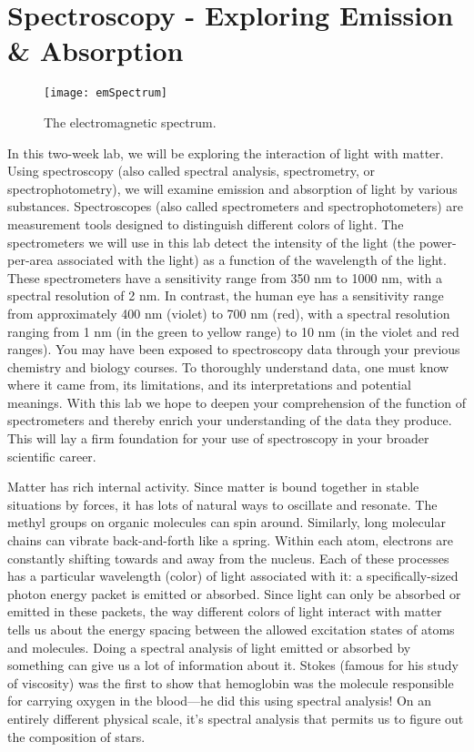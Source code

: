 \chapter{Spectroscopy - Exploring Emission \& Absorption}
\thispagestyle{fancy}
%
\begin{wrapfigure}{R}{0.50\textwidth}
  \vspace{-25pt}  
  \begin{center}
    \texttt{[image: emSpectrum]}
  \end{center}
  \caption{The electromagnetic spectrum.}
  \label{fig:emSpec}
  \vspace{-5pt}
\end{wrapfigure}
In this two-week lab, we will be exploring the interaction of light with matter. 
Using spectroscopy (also called spectral analysis, spectrometry, or spectrophotometry), we will examine emission and absorption of light by various substances. 
Spectroscopes (also called spectrometers and spectrophotometers) are measurement tools designed to distinguish different colors of light. 
The spectrometers we will use in this lab detect the intensity of the light (the power-per-area associated with the light) as a function of the wavelength of the light. 
These spectrometers have a sensitivity range from 350 nm to 1000 nm, with a spectral resolution of 2 nm. 
In contrast, the human eye has a sensitivity range from approximately 400 nm (violet) to 700 nm (red), with a spectral resolution ranging from 1 nm (in the green to yellow range) to 10 nm (in the violet and red ranges). 
You may have been exposed to spectroscopy data through your previous chemistry and biology courses. 
To thoroughly understand data, one must know where it came from, its limitations, and its interpretations and potential meanings. 
With this lab we hope to deepen your comprehension of the function of spectrometers and thereby enrich your understanding of the data they produce. 
This will lay a firm foundation for your use of spectroscopy in your broader scientific career. 
\par
Matter has rich internal activity. 
Since matter is bound together in stable situations by forces, it has lots of natural ways to oscillate and resonate. 
The methyl groups on organic molecules can spin around. 
Similarly, long molecular chains can vibrate back-and-forth like a spring. 
Within each atom, electrons are constantly shifting towards and away from the nucleus. 
Each of these processes has a particular wavelength (color) of light associated with it: a specifically-sized photon energy packet is emitted or absorbed. 
Since light can only be absorbed or emitted in these packets, the way different colors of light interact with matter tells us about the energy spacing between the allowed excitation states of atoms and molecules. 
Doing a spectral analysis of light emitted or absorbed by something can give us a lot of information about it. 
Stokes (famous for his study of viscosity) was the first to show that hemoglobin was the molecule responsible for carrying oxygen in the blood—he did this using spectral analysis! 
On an entirely different physical scale, it's spectral analysis that permits us to figure out the composition of stars. 

